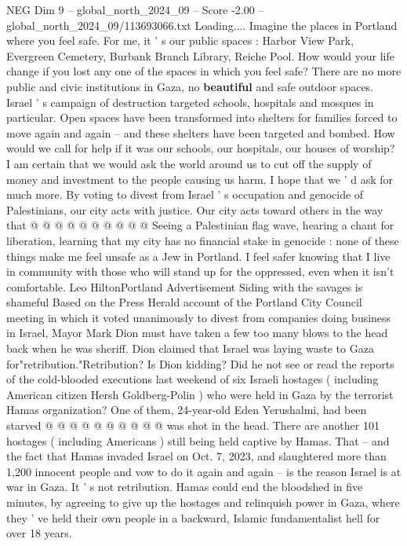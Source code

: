 \begin{textsample}{NEG Dim 9 – global\_north\_2024\_09 – Score -2.00 – global\_north\_2024\_09/113693066.txt}  \label{ex:f9_neg_209}
Loading....
Imagine the places in Portland where you feel safe.
For me, it ' s our public spaces : Harbor View Park, Evergreen Cemetery, Burbank Branch Library, Reiche Pool.
How would your life change if you lost any one of the spaces in which you feel safe?
There are no more public and civic institutions in Gaza, no \textbf{beautiful} and safe outdoor spaces.
Israel ' s campaign of destruction targeted schools, hospitals and mosques in particular.
Open spaces have been transformed into shelters for families forced to move again and again -- and these shelters have been targeted and bombed.
How would we call for help if it was our schools, our hospitals, our houses of worship?
I am certain that we would ask the world around us to cut off the supply of money and investment to the people causing us harm.
I hope that we ' d ask for much more.
By voting to divest from Israel ' s occupation and genocide of Palestinians, our city acts with justice.
Our city acts toward others in the way that @ @ @ @ @ @ @ @ @ @ Seeing a Palestinian flag wave, hearing a chant for liberation, learning that my city has no financial stake in genocide : none of these things make me feel unsafe as a Jew in Portland.
I feel safer knowing that I live in community with those who will stand up for the oppressed, even when it isn't comfortable.
Leo HiltonPortland Advertisement Siding with the savages is shameful Based on the Press Herald account of the Portland City Council meeting in which it voted unanimously to divest from companies doing business in Israel, Mayor Mark Dion must have taken a few too many blows to the head back when he was sheriff.
Dion claimed that Israel was laying waste to Gaza for"retribution."Retribution?
Is Dion kidding?
Did he not see or read the reports of the cold-blooded executions last weekend of six Israeli hostages ( including American citizen Hersh Goldberg-Polin ) who were held in Gaza by the terrorist Hamas organization?
One of them, 24-year-old Eden Yerushalmi, had been starved @ @ @ @ @ @ @ @ @ @ was shot in the head.
There are another 101 hostages ( including Americans ) still being held captive by Hamas.
That -- and the fact that Hamas invaded Israel on Oct. 7, 2023, and slaughtered more than 1,200 innocent people and vow to do it again and again -- is the reason Israel is at war in Gaza.
It ' s not retribution.
Hamas could end the bloodshed in five minutes, by agreeing to give up the hostages and relinquish power in Gaza, where they ' ve held their own people in a backward, Islamic fundamentalist hell for over 18 years.

\end{textsample}
